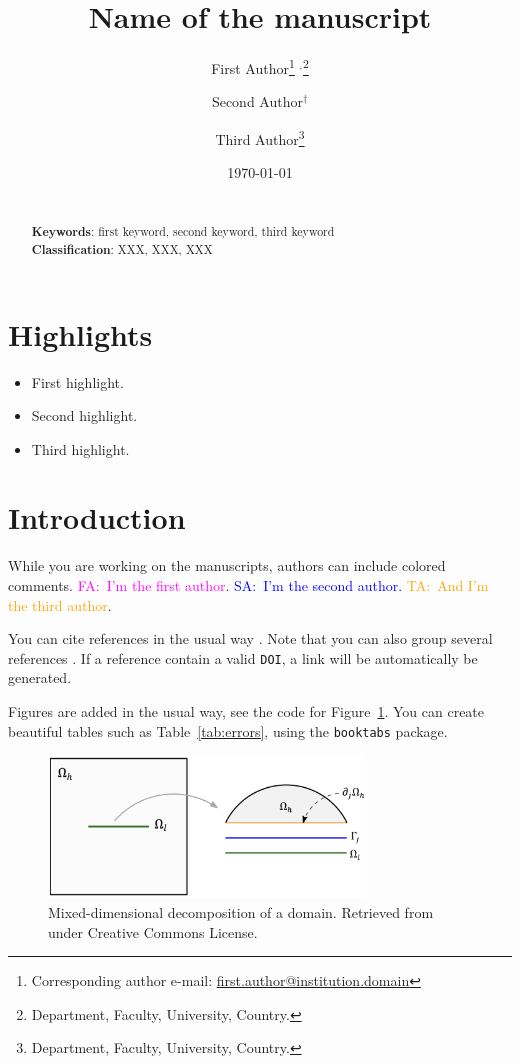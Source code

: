 \documentclass{article}
\title{Name of the manuscript}
\author{First Author\footnote{Corresponding author e-mail: \href{mailto:first.author@institution.domain}{first.author@institution.domain}} $^{,}$\footnote{Department, Faculty, University, Country.} \and Second Author$^{\dagger}$ \and Third Author\footnote{Department, Faculty, University, Country.}}
\date{\today}
\newcommand{\fa}[1]{\textcolor{magenta}{FA:~#1}} \newcommand{\sa}[1]{\textcolor{blue}{SA:~#1}}
\newcommand{\ta}[1]{\textcolor{orange}{TA:~#1}}
\begin{document}
\maketitle
\begin{abstract}
\thispagestyle{empty}
\lipsum[1] \vspace{3mm} \\
\textbf{Keywords}: first keyword, second keyword, third keyword \vspace{3mm} \\
\textbf{Classification}: XXX, XXX, XXX \\
\end{abstract}
\newpage

\thispagestyle{empty}
\section*{Highlights}
\begin{itemize}
    \item First highlight.
    \item Second highlight.
    \item Third highlight.
\end{itemize}

\tableofcontents
\newpage


\section{Introduction\label{sec:intro}}

While you are working on the manuscripts, authors can include colored comments. \fa{I'm the first author}. \sa{I'm the second author}. \ta{And I'm the third author}.

You can cite references in the usual way \cite{keilegavlen2021porepy}. Note that you can also group several references \cite{vohralik2005Poincare, pencheva2013mortar, repin2000variational}. If a reference contain a valid \texttt{DOI}, a link will be automatically be generated.

Figures are added in the usual way, see the code for Figure~\ref{fig:md_geo}. You can create beautiful tables such as Table~\ref{tab:errors}, using the \texttt{booktabs} package.

\begin{figure}[t]
    \centering
    \includegraphics[width=0.75\textwidth]{fig_mixdim.png}
    \caption{Mixed-dimensional decomposition of a domain. Retrieved from \cite{keilegavlen2021porepy} under Creative Commons License. \label{fig:md_geo}}
\end{figure}
\end{document}
